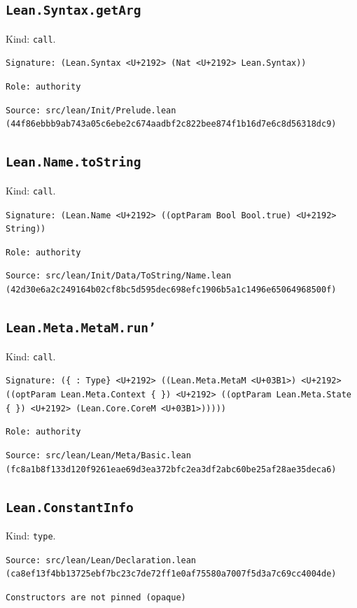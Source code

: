 \documentclass[11pt]{article}
\begin{document}
\subsection*{\texttt{Lean.Syntax.getArg}}
\noindent Kind: \texttt{call}.\par
\noindent \texttt{Signature: (Lean.Syntax <U+2192> (Nat <U+2192> Lean.Syntax))}\par
\noindent \texttt{Role: authority}\par
\noindent \texttt{Source: src/lean/Init/Prelude.lean (44f86ebbb9ab743a05c6ebe2c674aadbf2c822bee874f1b16d7e6c8d56318dc9)}\par
\subsection*{\texttt{Lean.Name.toString}}
\noindent Kind: \texttt{call}.\par
\noindent \texttt{Signature: (Lean.Name <U+2192> ((optParam Bool Bool.true) <U+2192> String))}\par
\noindent \texttt{Role: authority}\par
\noindent \texttt{Source: src/lean/Init/Data/ToString/Name.lean (42d30e6a2c249164b02cf8bc5d595dec698efc1906b5a1c1496e65064968500f)}\par
\subsection*{\texttt{Lean.Meta.MetaM.run'}}
\noindent Kind: \texttt{call}.\par
\noindent \texttt{Signature: (\{<U+03B1> : Type\} <U+2192> ((Lean.Meta.MetaM <U+03B1>) <U+2192> ((optParam Lean.Meta.Context \{ \}) <U+2192> ((optParam Lean.Meta.State \{ \}) <U+2192> (Lean.Core.CoreM <U+03B1>)))))}\par
\noindent \texttt{Role: authority}\par
\noindent \texttt{Source: src/lean/Lean/Meta/Basic.lean (fc8a1b8f133d120f9261eae69d3ea372bfc2ea3df2abc60be25af28ae35deca6)}\par
\subsection*{\texttt{Lean.ConstantInfo}}
\noindent Kind: \texttt{type}.\par
\noindent \texttt{Source: src/lean/Lean/Declaration.lean (ca8ef13f4bb13725ebf7bc23c7de72ff1e0af75580a7007f5d3a7c69cc4004de)}\par
\noindent \texttt{Constructors are not pinned (opaque)}\par
\end{document}
